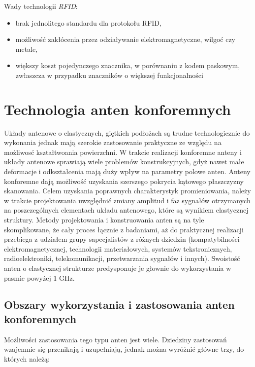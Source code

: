 Wady technologii \emph{RFID}:


\begin{itemize}\setlength{\itemsep}{0pt}

	\item brak jednolitego standardu dla protokołu RFID,
	
	\item możliwość zakłócenia przez odziaływanie elektromagnetyczne, wilgoć czy metale,
 	
 	\item większy koszt pojedynczego znacznika, w porównaniu z kodem paskowym, zwłaszcza w przypadku znaczników o większej funkcjonalności 

\end{itemize}




\chapter{Technologia anten konforemnych}

Układy antenowe o elastycznych, giętkich podłożach są trudne technologicznie do wykonania jednak mają szerokie zastosowanie praktyczne ze względu na możliwosć kształtwoania powierzchni. 
W trakcie realizacji konforemne anteny i układy antenowe sprawiają wiele problemów konstrukcyjnych, gdyż nawet małe deformacje i odkształcenia mają duży wpływ na parametry polowe anten. 
Anteny konforemne dają możliwość uzyskania szerszego pokrycia kątowego płaszczyzny skanowania. Celem uzyskania poprawnych charakterystyk promieniowania, należy w trakcie projektowania uwzględnić zmiany amplitud i faz sygnałów otrzymanych na poszczególnych elementach układu antenowego, które są wynikiem elastycznej struktury.    
Metody projektowania i konstruowania anten są na tyle skomplikowane, że cały proces łącznie z badaniami, aż do praktycznej realizacji przebiega z udziałem grupy sapecjalistów z różnych dziedzin (kompatybilności elektromagnetycznej, technologii materiałowych, systemów tekstronicznych, radioelektroniki, telekomunikacji, przetwarzania sygnałów i innych). Swoistość anten o elastycznej strukturze predysponuje je głownie do wykorzystania w pasmie powyżej 1 GHz.     

\section{Obszary wykorzystania i zastosowania anten konforemnych}

Możliwości zastosowania tego typu anten jest wiele. Dziedziny zastosowań wzajemnie się przenikają i uzupełniają, jednak można wyróżnić główne trzy, do których należą:

